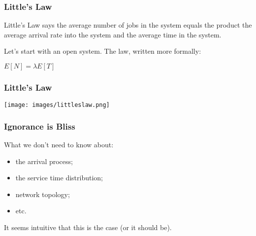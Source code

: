 \begin{frame}
\frametitle{Little's Law}

Little's Law says the average number of jobs in the system equals the product the average arrival rate into the system and the average time in the system. 

Let's start with an open system. The law, written more formally:

\begin{center}
	$E[N] = \lambda E[T]$
\end{center}

\end{frame}



\begin{frame}
\frametitle{Little's Law}

\begin{center}
	\texttt{[image: images/littleslaw.png]}
\end{center}

\end{frame}



\begin{frame}
\frametitle{Ignorance is Bliss}

\large
\begin{changemargin}{1.5cm}
What we don't need to know about:
\begin{itemize}
\item the arrival process;
\item the service time distribution;
\item network topology;
\item etc. 
\end{itemize}

It seems intuitive that this is the case (or it should be). 
\end{changemargin}

\end{frame}



